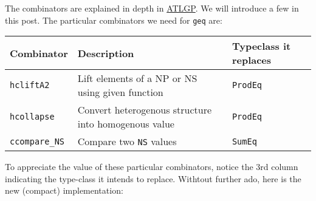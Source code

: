 The combinators are explained in depth in
\href{https://github.com/kosmikus/SSGEP/blob/master/LectureNotes.pdf}{ATLGP}.
We will introduce a few in this post. The particular combinators we need
for \texttt{geq} are:

\begin{longtable}[]{@{}lll@{}}
\toprule
Combinator & Description & Typeclass it replaces \\
\midrule
\endhead
\texttt{hcliftA2} & Lift elements of a NP or NS using given function &
\texttt{ProdEq} \\
\texttt{hcollapse} & Convert heterogenous structure into homogenous
value & \texttt{ProdEq} \\
\texttt{ccompare\_NS} & Compare two \texttt{NS} values &
\texttt{SumEq} \\
\bottomrule
\end{longtable}

To appreciate the value of these particular combinators, notice the 3rd
column indicating the type-class it intends to replace. Withtout further
ado, here is the new (compact) implementation:

